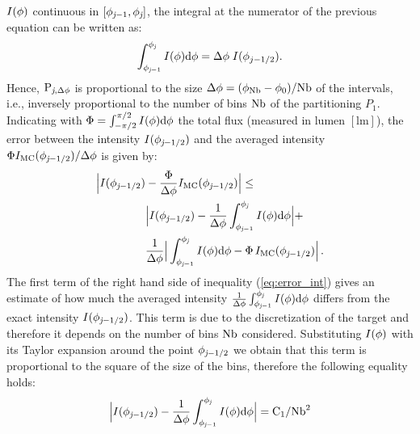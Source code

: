 $I(\phi)$ continuous in $[\phi_{\textit{j}-1}, \phi_{\textit{j}}]$, the integral at the numerator of the previous equation can be written as: \begin{equation}
\int_{\phi_{\textit{j}-1}}^{\phi_{\textit{j}}} I(\phi) \textrm{d}\phi = \Delta \phi\;I(\phi_{j-1/2}).
\end{equation}
Hence, $\textrm{P}_{\textit{j}, \Delta\phi}$ is proportional to the size $\Delta\phi= (\phi_{\textrm{Nb}}-\phi_{0})/{\textrm{Nb}}$ 
of the intervals, i.e., inversely proportional to the number of bins $\textrm{Nb}$ of the partitioning $P_1$.
Indicating with $\Phi = \int_{-\pi/2}^{\pi/2}I(\phi) \textrm{d}\phi$ the total flux (measured in lumen $[\textrm{lm}]$),
the error between the intensity $I(\phi_{\textit{j}-1/2})$
 and the averaged  intensity $\Phi I_{\textrm{MC}}(\phi_{\textit{j}-1/2})/\Delta\phi$ is given by:
\begin{equation}\label{eq:error_int}
\begin{aligned}
\Big|I(\phi_{\textit{j}-1/2})&-\frac{\Phi}
{\Delta\phi}I_{\textrm{MC}}(\phi_{\textit{j}-1/2})\Big| \leq\\
 &\Big|I(\phi_{\textit{j}-1/2})-\frac{1}{\Delta \phi}\int_{\phi_{\textit{j}-1}}^{\phi_{\textit{j}}} I(\phi)\textrm{d}\phi\Big|+\\
&\frac{1}{\Delta \phi}\Big|\int_{\phi_{\textit{j}-1}}^{\phi_{\textit{j}}} I(\phi)\textrm{d}\phi-
\Phi\, I_{\textrm{MC}}(\phi_{\textit{j}-1/2})\Big| \,.
\end{aligned}
\end{equation}
\indent The first term of the right hand side of inequality (\ref{eq:error_int}) gives an estimate of how much the averaged intensity
 $\frac{1}{\Delta \phi}\int_{\phi_{\textit{j}-1}}^{\phi_{\textit{j}}} I(\phi)\textrm{d}\phi$ differs from the exact intensity $I(\phi_{\textit{j}-1/2})$.
This term is due to the discretization of the target and therefore it depends on the number of bins $\textrm{Nb}$ considered.
  Substituting $I(\phi)$ with its Taylor expansion around the point $\phi_{\textit{j}-1/2}$ we obtain that this term is proportional to the square of the size of the bins, therefore the following equality holds:
\begin{equation}\Big|I(\phi_{\textit{j}-1/2})-\frac{1}{\Delta \phi}\int_{\phi_{\textit{j}-1}}^{\phi_{\textit{j}}} I(\phi)\textrm{d}\phi\Big| = \textrm{C}_1/\textrm{Nb}^2\end{equation}
